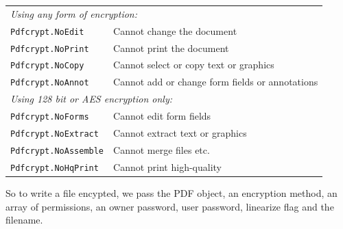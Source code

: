 \documentclass[a4paper]{memoir}
\begin{document}
\begin{framed}
\begin{tabular}{ll}
\multicolumn{2}{l}{\textit{Using any form of encryption:}}\\[2mm]
\verb!Pdfcrypt.NoEdit! & Cannot change the document\\
\verb!Pdfcrypt.NoPrint! & Cannot print the document\\
\verb!Pdfcrypt.NoCopy! & Cannot select or copy text or graphics\\
\verb!Pdfcrypt.NoAnnot! & Cannot add or change form fields or annotations\\[3mm]
\multicolumn{2}{l}{\textit{Using 128 bit or AES encryption only:}}\\[2mm]
\verb!Pdfcrypt.NoForms! & Cannot edit form fields \\
\verb!Pdfcrypt.NoExtract! & Cannot extract text or graphics\\
\verb!Pdfcrypt.NoAssemble! & Cannot merge files etc.\\
\verb!Pdfcrypt.NoHqPrint! & Cannot print high-quality
\end{tabular}
\end{framed}

So to write a file encypted, we pass the PDF object, an encryption method, an
array of permissions, an owner password, user password, linearize flag and the
filename.
\end{document}
